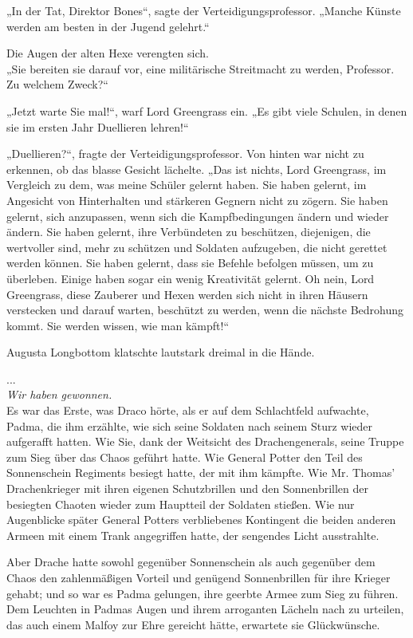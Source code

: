 {„In der Tat, Direktor Bones“, sagte der Verteidigungsprofessor. „Manche Künste werden am besten in der Jugend gelehrt.“

Die Augen der alten Hexe verengten sich.\\ „Sie bereiten sie darauf vor, eine militärische Streitmacht zu werden, Professor. Zu welchem Zweck?“

„Jetzt warte Sie mal!“, warf Lord Greengrass ein. „Es gibt viele Schulen, in denen sie im ersten Jahr Duellieren lehren!“

„Duellieren?“, fragte der Verteidigungsprofessor. Von hinten war nicht zu erkennen, ob das blasse Gesicht lächelte. „Das ist nichts, Lord Greengrass, im Vergleich zu dem, was meine Schüler gelernt haben. Sie haben gelernt, im Angesicht von Hinterhalten und stärkeren Gegnern nicht zu zögern. Sie haben gelernt, sich anzupassen, wenn sich die Kampfbedingungen ändern und wieder ändern. Sie haben gelernt, ihre Verbündeten zu beschützen, diejenigen, die wertvoller sind, mehr zu schützen und Soldaten aufzugeben, die nicht gerettet werden können. Sie haben gelernt, dass sie Befehle befolgen müssen, um zu überleben. Einige haben sogar ein wenig Kreativität gelernt. Oh nein, Lord Greengrass, diese Zauberer und Hexen werden sich nicht in ihren Häusern verstecken und darauf warten, beschützt zu werden, wenn die nächste Bedrohung kommt. Sie werden wissen, wie man kämpft!“

Augusta Longbottom klatschte lautstark dreimal in die Hände.

...\\ \emph{Wir haben gewonnen.}\\ Es war das Erste, was Draco hörte, als er auf dem Schlachtfeld aufwachte, Padma, die ihm erzählte, wie sich seine Soldaten nach seinem Sturz wieder aufgerafft hatten. Wie Sie, dank der Weitsicht des Drachengenerals, seine Truppe zum Sieg über das Chaos geführt hatte. Wie General Potter den Teil des Sonnenschein Regiments besiegt hatte, der mit ihm kämpfte. Wie Mr. Thomas' Drachenkrieger mit ihren eigenen Schutzbrillen und den Sonnenbrillen der besiegten Chaoten wieder zum Hauptteil der Soldaten stießen. Wie nur Augenblicke später General Potters verbliebenes Kontingent die beiden anderen Armeen mit einem Trank angegriffen hatte, der sengendes Licht ausstrahlte.

Aber Drache hatte sowohl gegenüber Sonnenschein als auch gegenüber dem Chaos den zahlenmäßigen Vorteil und genügend Sonnenbrillen für ihre Krieger gehabt; und so war es Padma gelungen, ihre geerbte Armee zum Sieg zu führen.\\ Dem Leuchten in Padmas Augen und ihrem arroganten Lächeln nach zu urteilen, das auch einem Malfoy zur Ehre gereicht hätte, erwartete sie Glückwünsche.

}
